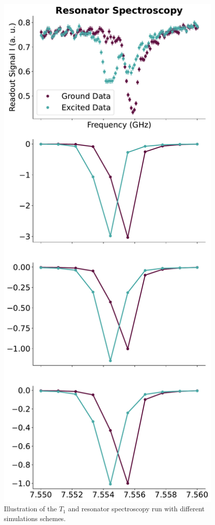 \begin{figure}[h]
\begin{minipage}{0.50\textwidth}
    \end{minipage}
        \begin{minipage}{0.50\textwidth}
        \centering
        \includegraphics[]{Simulations/simulations_of_calibrations/Figs/resonator_spectroscopy.pdf}
    \end{minipage}
    \caption{Illustration of the $T_1$ and resonator spectroscopy run with different simulations schemes.}
    \label{fig:calibrations_in_simulation}
\end{figure}



